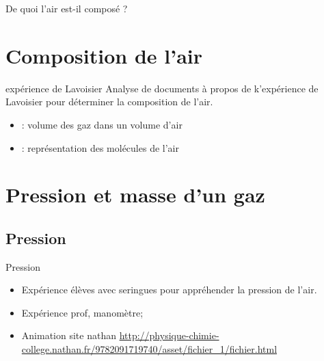 \documentclass[12pt,a4paper]{article}
\begin{document}
	
	

\begin{mypb}
	De quoi l'air est-il composé ?
\end{mypb}

\section{Composition de l'air}

\begin{myact}{expérience de Lavoisier}
	Analyse de documents à propos de k'expérience de Lavoisier pour déterminer la composition de l'air.
\end{myact}




\begin{myexos}
	\begin{itemize}
		\item {} : volume des gaz dans un volume d'air
		\item {} : représentation des molécules de l'air
	\end{itemize}%
\end{myexos}




\section{Pression et masse d'un gaz}

\subsection{Pression}

\begin{myact}{Pression}
		
	\begin{itemize}
		\item Expérience élèves avec seringues pour appréhender la pression de l'air.
		
		\item Expérience prof, manomètre;
		
		\item Animation site nathan \url{http://physique-chimie-college.nathan.fr/9782091719740/asset/fichier_1/fichier.html}
	\end{itemize}
	 
\end{myact}
\end{document}
